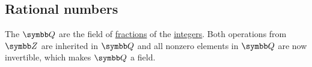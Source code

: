 \subsection{Rational numbers}\label{subsec:rational_numbers}

\begin{definition}\label{def:rational_numbers}
  The  \( \BQ \) are the field of \hyperref[def:field_of_fractions]{fractions} of the \hyperref[def:integers]{integers}. Both operations from \( \BZ \) are inherited in \( \BQ \) and all nonzero elements in \( \BQ \) are now invertible, which makes \( \BQ \) a field.
\end{definition}
